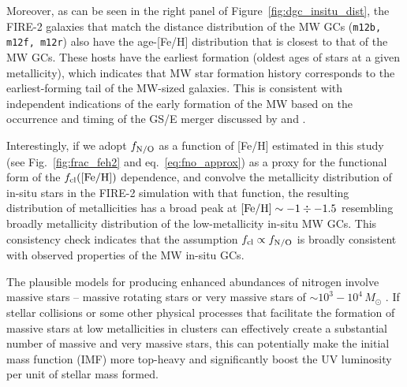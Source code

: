 \documentclass[a4paper,useAMS,usenatbib]{mnras}
\begin{document}
Moreover, as can be seen in the right panel of Figure~\ref{fig:dgc_insitu_dist}, the FIRE-2 galaxies that match the distance distribution of the MW GCs ({\tt m12b, m12f, m12r}) also have the age-[Fe/H] distribution that is closest to that of the MW GCs. These hosts have the earliest formation (oldest ages of stars at a given metallicity), which indicates that MW star formation history corresponds to the earliest-forming tail of the MW-sized galaxies. This is 
consistent with independent indications of the early formation of the MW based on the occurrence and timing of the GS/E merger discussed by \citet{Fattahi.etal.2019} and \citet{Dillamore.etal.2022}.

Interestingly, if we adopt $f_{\rm N/O}$ as a function of [Fe/H] estimated in this study (see Fig.~\ref{fig:frac_feh2} and eq.~\ref{eq:fno_approx}) as a proxy for the functional form of
the $f_{\rm cl}(\rm [Fe/H])$ dependence, and convolve the metallicity distribution of in-situ stars in the FIRE-2 simulation with that function, the resulting distribution of metallicities has a broad peak at $\rm [Fe/H]\sim -1\div -1.5$ resembling broadly metallicity distribution of the low-metallicity in-situ MW GCs. This consistency check indicates that the assumption $f_{\rm cl}\propto f_{\rm N/O}$ is broadly consistent with observed properties of the MW in-situ GCs.

The plausible models for producing enhanced abundances of nitrogen involve massive stars \citep[see, e.g.,][]{Bastian_Lardo2018} -- massive rotating stars \citep[$M\gtrsim 15\, M_\odot$, e.g.,][]{Maeder.Meynet.2006,Crowther.2007} or very massive stars of $\sim 10^3-10^4\, M_\odot$ \citep{Denissenkov.Hartwick.2014}.  If stellar collisions or some other physical processes that facilitate the formation of massive stars at low metallicities in clusters can effectively create a substantial number of massive and very massive stars, this can potentially make the initial mass function (IMF) more top-heavy \citep[see, e.g.,][]{Dib.etal.2007,Chon.etal.2021} and significantly boost the UV luminosity per unit of stellar mass formed. 
\end{document}
